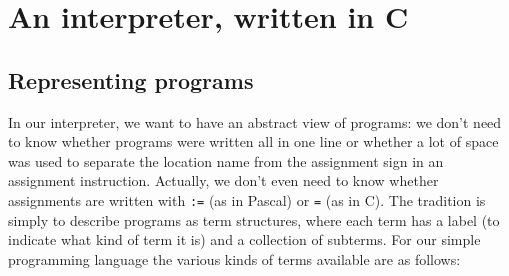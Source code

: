 \documentclass{book}
\begin{document}
\section{An interpreter, written in C}
\subsection{Representing programs}
In our interpreter, we want to have an abstract view of programs:
we don't need to know whether programs were written all in one line or
whether a lot of space was used to separate the location name from the
assignment sign in an assignment instruction.  Actually, we don't even
need to know whether assignments are written with {\tt :=} (as in Pascal)
or {\tt =} (as in C).  The tradition is simply to describe programs
as term structures, where each term has a label (to indicate what kind
of term it is) and a collection of subterms.  For our simple programming
language the various kinds of terms available are as follows:
\end{document}
